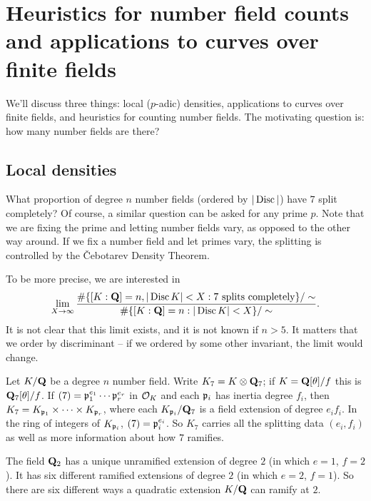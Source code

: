 
\section{Heuristics for number field counts and applications to curves over finite fields}\label{sec:wood-iv}





We'll discuss three things: local ($p$-adic) densities, applications to curves 
over finite fields, and heuristics for counting number fields. 
The motivating question is: how many number fields are there? 





\subsection{Local densities}

What proportion of degree $n$ number fields (ordered by $|\operatorname{Disc}|$) have 
$7$ split completely? Of course, a similar question can be asked for any prime 
$p$. Note that we are fixing the prime and letting number fields vary, as 
opposed to the other way around. If we fix a number field and let primes 
vary, the splitting is controlled by the \v Cebotarev Density Theorem. 

To be more precise, we are interested in 
\[
  \lim_{X\to \infty} \frac{\#\{[K:\mathbf{Q}]=n,|\operatorname{Disc} K|<X:7\text{ splits completely}\}/\sim}{\#\{[K:\mathbf{Q}]=n:|\operatorname{Disc} K|<X\}/\sim} .
\]
It is not clear that this limit exists, and it is not known if $n>5$. It 
matters that we order by discriminant -- if we ordered by some other invariant, 
the limit would change. 

Let $K/\mathbf{Q}$ be a degree $n$ number field. Write $K_7=K\otimes \mathbf{Q}_7$; if 
$K=\mathbf{Q}[\theta]/f$ this is $\mathbf{Q}_7[\theta]/f$. If 
$(7)=\mathfrak{p}_1^{e_1}\cdots \mathfrak{p}_r^{e_r}$ in $\mathcal{O}_K$ and each $\mathfrak{p}_i$ has inertia 
degree $f_i$, then $K_7=K_{\mathfrak{p}_1}\times \cdots \times K_{\mathfrak{p}_r}$, where each 
$K_{\mathfrak{p}_i}/\mathbf{Q}_7$ is a field extension of degree $e_i f_i$. In the ring of 
integers of $K_{\mathfrak{p}_i}$, $(7)=\mathfrak{p}_i^{e_i}$. So $K_7$ carries all the splitting 
data $(e_i,f_i)$ as well as more information about how $7$ ramifies. 

\begin{example}
The field $\mathbf{Q}_2$ has a unique unramified extension of degree $2$ (in which 
$e=1$, $f=2$). It has six different ramified extensions of degree $2$ (in 
which $e=2$, $f=1$). So there are six different ways a quadratic extension 
$K/\mathbf{Q}$ can ramify at $2$. 
\end{example}

